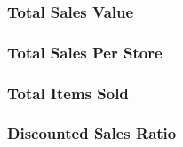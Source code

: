 \documentclass{article}
\begin{document}
            \subsubsection{Total Sales Value}
            \subsubsection{Total Sales Per Store}

            \subsubsection{Total Items Sold}
                


            \subsubsection{Discounted Sales Ratio}
\end{document}
